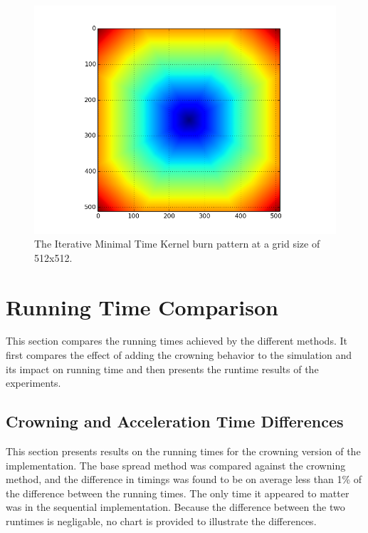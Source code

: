 \begin{figure}%
\centering
  \includegraphics[height=0.27\textheight]{figures/results/it_min_time.png}
  \caption{The Iterative Minimal Time Kernel burn pattern at a grid size of 512x512.}
  \label{fig:it_min_time}
\end{figure}

\section{Running Time Comparison}
This section compares the running times achieved by the different methods. It first compares the effect of adding the crowning behavior to the simulation and its impact on running time and then presents the runtime results of the experiments.

\subsection*{Crowning and Acceleration Time Differences}
This section presents results on the running times for the crowning version of the implementation. The base spread method was compared against the crowning method, and the difference in timings was found to be on average less than 1\% of the difference between the running times. The only time it appeared to matter was in the sequential implementation. Because the difference between the two runtimes is negligable, no chart is provided to illustrate the differences. 
 
